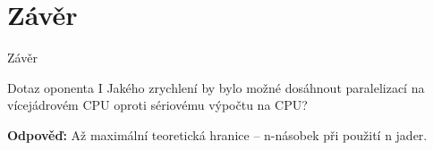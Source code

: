 \documentclass[compress,mathserif]{beamer}
\theoremstyle{definition}
\theoremstyle{plain}
\begin{document}
\section{Závěr}
    \begin{frame}{Závěr}
      
    \end{frame}
    
    \begin{frame}{Dotaz oponenta I}
      Jakého zrychlení by bylo možné dosáhnout paralelizací na vícejádrovém CPU oproti sériovému výpočtu na CPU?
      
      \textbf{Odpověď:} Až maximální teoretická hranice -- n-násobek při použití n jader.
    \end{frame}
    
\end{document}
